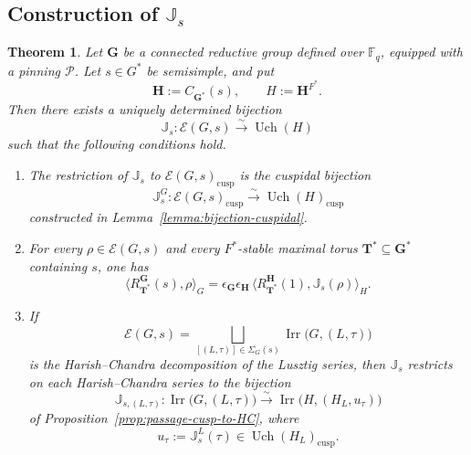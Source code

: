 \documentclass{amsart}
\theoremstyle{plain}
\numberwithin{equation}{section}
\newtheorem{theorem}{Theorem}[section]
\theoremstyle{definition}
\newcommand{\cP}{\mathcal{P}}
\newcommand{\cE}{\mathcal{E}}
\newcommand{\Irr}{\operatorname{Irr}}
\newcommand{\Uch}{\operatorname{Uch}}
\newcommand{\J}{\mathbb{J}}
\newcommand{\cusp}{\operatorname{cusp}}
\newcommand{\bG}{\mathbf{G}}
\newcommand{\bT}{\mathbf{T}}
\newcommand{\bH}{\mathbf{H}}
\newcommand{\F}{\mathbb{F}}
\begin{document}
\subsection{Construction of $\J_s$}
\label{subsec:construction-Js}

\begin{theorem}\label{thm:JD-connected-groups}
Let \(\bG\) be a connected reductive group defined over \(\F_q\), equipped with a
pinning \(\cP\). Let \(s\in G^*\) be semisimple, and put
\[
\bH:=C_{\bG^*}(s),\qquad H:=\bH^{F^*}.
\]
Then there exists a uniquely determined bijection
\[
\J_s:\cE(G,s)\xrightarrow{\ \sim\ }\Uch(H)
\]
such that the following conditions hold.

\begin{enumerate}[label={\normalfont(\arabic*)}]
\item The restriction of \(\J_s\) to \(\cE(G,s)_{\cusp}\) is the cuspidal bijection
\[
\J_s^G:\cE(G,s)_{\cusp}\xrightarrow{\sim}\Uch(H)_{\cusp}
\]
constructed in Lemma~\ref{lemma:bijection-cuspidal}.

\item For every \(\rho\in \cE(G,s)\) and every \(F^*\)-stable maximal torus
\(\bT^*\subseteq \bG^*\) containing \(s\), one has
\[
\bigl\langle R_{\bT^*}^{\bG}(s),\rho\bigr\rangle_G
=
\epsilon_{\bG}\epsilon_{\bH}\,
\bigl\langle R_{\bT^*}^{\bH}(1),\J_s(\rho)\bigr\rangle_H.
\]

\item If
\[
\cE(G,s)=\bigsqcup_{[(L,\tau)]\in \Sigma_G(s)} \Irr\bigl(G,(L,\tau)\bigr)
\]
is the Harish--Chandra decomposition of the Lusztig series, then
\(\J_s\) restricts on each Harish--Chandra series to the bijection
\[
\J_{s,(L,\tau)}:\Irr\bigl(G,(L,\tau)\bigr)\xrightarrow{\sim}
\Irr\bigl(H,(H_L,u_\tau)\bigr)
\]
of Proposition~\ref{prop:passage-cusp-to-HC}, where
\[
u_\tau:=\J_s^L(\tau)\in \Uch(H_L)_{\cusp}.
\]
\end{enumerate}
\end{theorem}
\end{document}
